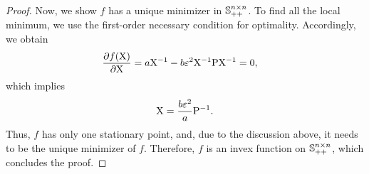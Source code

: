 \begin{proof}
    Now, we show $f$ has a unique minimizer in ${\mathbb{S}}_{++}^{n \times n}$.  To find all the local minimum, we use the first-order necessary condition for optimality. Accordingly, we obtain
    \begin{equation}
        \begin{split}
            \pdv{f({ \mathrm{X} })}{{ \mathrm{X} }} &= a { \mathrm{X} }^{-1} - b\varepsilon^2 { \mathrm{X} }^{-1}{ \mathrm{P} }{ \mathrm{X} }^{-1} = 0,
        \end{split}
    \end{equation}
    which implies
    \begin{equation}
        { \mathrm{X} } = \frac{b\varepsilon^2}{a} { \mathrm{P} }^{-1}.
    \end{equation}
    Thus, $f$ has only one stationary point, and, due to the discussion above,  it needs to be the unique minimizer of $f$. Therefore, $f$ is an invex function on ${\mathbb{S}}_{++}^{n\times n}$, which concludes the proof. 
\end{proof}

